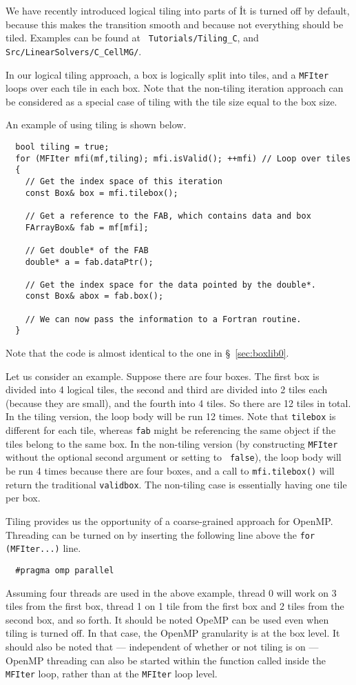 We have recently introduced logical tiling into parts of \boxlib\.  It
is turned off by default, because this makes the transition smooth and
because not everything should be tiled.  Examples can be found at {\tt
  Tutorials/Tiling\_C}, and {\tt Src/LinearSolvers/C\_CellMG/}.

In our logical tiling approach, a box is logically split into tiles,
and a {\tt MFIter} loops over each tile in each box.  Note that the
non-tiling iteration approach can be considered as a special case of
tiling with the tile size equal to the box size.

An example of using tiling is shown below.

\begin{lstlisting}
  bool tiling = true;
  for (MFIter mfi(mf,tiling); mfi.isValid(); ++mfi) // Loop over tiles
  {
    // Get the index space of this iteration
    const Box& box = mfi.tilebox(); 

    // Get a reference to the FAB, which contains data and box  
    FArrayBox& fab = mf[mfi];  

    // Get double* of the FAB 
    double* a = fab.dataPtr();

    // Get the index space for the data pointed by the double*.
    const Box& abox = fab.box();

    // We can now pass the information to a Fortran routine.
  }
\end{lstlisting}
Note that the code is almost identical to the one in \S~\ref{sec:boxlib0}.

Let us consider an example.  Suppose there are four boxes.  The first
box is divided into 4 logical tiles, the second and third are divided
into 2 tiles each (because they are small), and the fourth into 4 tiles.
So there are 12 tiles in total.  In the tiling version, the loop body
will be run 12 times.  Note that {\tt tilebox} is different for each
tile, whereas {\tt fab} might be referencing the same object if the tiles
belong to the same box.  In the non-tiling version (by constructing
{\tt MFIter} without the optional second argument or setting to {\tt
  false}), the loop body will be run 4 times because there are four
boxes, and a call to {\tt mfi.tilebox()} will return the traditional
{\tt validbox}.  The non-tiling case is essentially having one tile
per box.

Tiling provides us the opportunity of a coarse-grained approach for
OpenMP.  Threading can be turned on by inserting the following line
above the {\tt for (MFIter...)} line.
\begin{lstlisting}
  #pragma omp parallel
\end{lstlisting}
Assuming four threads are used in the above example, thread 0 will
work on 3 tiles from the first box, thread 1 on 1 tile from the first
box and 2 tiles from the second box, and so forth.  It should be noted
OpeMP can be used even when tiling is turned off.  In that case, the
OpenMP granularity is at the box level.  It should also be noted that
--- independent of whether or not tiling is on --- OpenMP threading
can also be started within the function called inside the {\tt MFIter}
loop, rather than at the {\tt MFIter} loop level.

